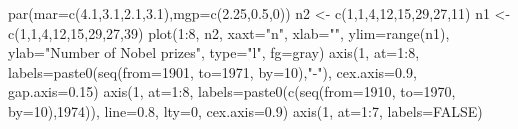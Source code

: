 \documentclass[
  10pt,
  b5paper]{book}
\newenvironment{Shaded}{\begin{snugshade}}{\end{snugshade}}
\newcommand{\AttributeTok}[1]{\textcolor[rgb]{0.77,0.63,0.00}{#1}}
\newcommand{\ConstantTok}[1]{\textcolor[rgb]{0.00,0.00,0.00}{#1}}
\newcommand{\DecValTok}[1]{\textcolor[rgb]{0.00,0.00,0.81}{#1}}
\newcommand{\FloatTok}[1]{\textcolor[rgb]{0.00,0.00,0.81}{#1}}
\newcommand{\FunctionTok}[1]{\textcolor[rgb]{0.00,0.00,0.00}{#1}}
\newcommand{\NormalTok}[1]{#1}
\newcommand{\OtherTok}[1]{\textcolor[rgb]{0.56,0.35,0.01}{#1}}
\newcommand{\SpecialCharTok}[1]{\textcolor[rgb]{0.00,0.00,0.00}{#1}}
\newcommand{\StringTok}[1]{\textcolor[rgb]{0.31,0.60,0.02}{#1}}
\begin{document}
\begin{Shaded}
\begin{Highlighting}[]
\FunctionTok{par}\NormalTok{(}\AttributeTok{mar=}\FunctionTok{c}\NormalTok{(}\FloatTok{4.1}\NormalTok{,}\FloatTok{3.1}\NormalTok{,}\FloatTok{2.1}\NormalTok{,}\FloatTok{3.1}\NormalTok{),}\AttributeTok{mgp=}\FunctionTok{c}\NormalTok{(}\FloatTok{2.25}\NormalTok{,}\FloatTok{0.5}\NormalTok{,}\DecValTok{0}\NormalTok{))}
\NormalTok{n2 }\OtherTok{\textless{}{-}} \FunctionTok{c}\NormalTok{(}\DecValTok{1}\NormalTok{,}\DecValTok{1}\NormalTok{,}\DecValTok{4}\NormalTok{,}\DecValTok{12}\NormalTok{,}\DecValTok{15}\NormalTok{,}\DecValTok{29}\NormalTok{,}\DecValTok{27}\NormalTok{,}\DecValTok{11}\NormalTok{)}
\NormalTok{n1 }\OtherTok{\textless{}{-}} \FunctionTok{c}\NormalTok{(}\DecValTok{1}\NormalTok{,}\DecValTok{1}\NormalTok{,}\DecValTok{4}\NormalTok{,}\DecValTok{12}\NormalTok{,}\DecValTok{15}\NormalTok{,}\DecValTok{29}\NormalTok{,}\DecValTok{27}\NormalTok{,}\DecValTok{39}\NormalTok{)}
\FunctionTok{plot}\NormalTok{(}\DecValTok{1}\SpecialCharTok{:}\DecValTok{8}\NormalTok{, n2, }\AttributeTok{xaxt=}\StringTok{"n"}\NormalTok{, }\AttributeTok{xlab=}\StringTok{""}\NormalTok{, }\AttributeTok{ylim=}\FunctionTok{range}\NormalTok{(n1),}
     \AttributeTok{ylab=}\StringTok{"Number of Nobel prizes"}\NormalTok{, }\AttributeTok{type=}\StringTok{"l"}\NormalTok{, }\AttributeTok{fg=}\StringTok{\textquotesingle{}gray\textquotesingle{}}\NormalTok{)}
\FunctionTok{axis}\NormalTok{(}\DecValTok{1}\NormalTok{, }\AttributeTok{at=}\DecValTok{1}\SpecialCharTok{:}\DecValTok{8}\NormalTok{, }\AttributeTok{labels=}\FunctionTok{paste0}\NormalTok{(}\FunctionTok{seq}\NormalTok{(}\AttributeTok{from=}\DecValTok{1901}\NormalTok{, }\AttributeTok{to=}\DecValTok{1971}\NormalTok{, }\AttributeTok{by=}\DecValTok{10}\NormalTok{),}\StringTok{"{-}"}\NormalTok{), }\AttributeTok{cex.axis=}\FloatTok{0.9}\NormalTok{, }\AttributeTok{gap.axis=}\FloatTok{0.15}\NormalTok{)}
\FunctionTok{axis}\NormalTok{(}\DecValTok{1}\NormalTok{, }\AttributeTok{at=}\DecValTok{1}\SpecialCharTok{:}\DecValTok{8}\NormalTok{, }\AttributeTok{labels=}\FunctionTok{paste0}\NormalTok{(}\FunctionTok{c}\NormalTok{(}\FunctionTok{seq}\NormalTok{(}\AttributeTok{from=}\DecValTok{1910}\NormalTok{, }\AttributeTok{to=}\DecValTok{1970}\NormalTok{, }\AttributeTok{by=}\DecValTok{10}\NormalTok{),}\DecValTok{1974}\NormalTok{)),}
     \AttributeTok{line=}\FloatTok{0.8}\NormalTok{, }\AttributeTok{lty=}\DecValTok{0}\NormalTok{, }\AttributeTok{cex.axis=}\FloatTok{0.9}\NormalTok{)}
\FunctionTok{axis}\NormalTok{(}\DecValTok{1}\NormalTok{, }\AttributeTok{at=}\DecValTok{1}\SpecialCharTok{:}\DecValTok{7}\NormalTok{, }\AttributeTok{labels=}\ConstantTok{FALSE}\NormalTok{)}

\end{Highlighting}
\end{Shaded}
\end{document}
